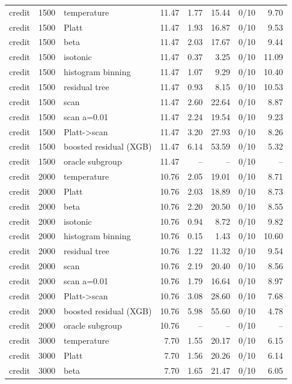 \begin{tabular}{lllrrrlr}
credit & 1500 & temperature & 11.47 & 1.77 & 15.44 & 0/10 & 9.70 \\
credit & 1500 & Platt & 11.47 & 1.93 & 16.87 & 0/10 & 9.53 \\
credit & 1500 & beta & 11.47 & 2.03 & 17.67 & 0/10 & 9.44 \\
credit & 1500 & isotonic & 11.47 & 0.37 & 3.25 & 0/10 & 11.09 \\
credit & 1500 & histogram binning & 11.47 & 1.07 & 9.29 & 0/10 & 10.40 \\
credit & 1500 & residual tree & 11.47 & 0.93 & 8.15 & 0/10 & 10.53 \\
credit & 1500 & scan & 11.47 & 2.60 & 22.64 & 0/10 & 8.87 \\
credit & 1500 & scan a=0.01 & 11.47 & 2.24 & 19.54 & 0/10 & 9.23 \\
credit & 1500 & Platt->scan & 11.47 & 3.20 & 27.93 & 0/10 & 8.26 \\
credit & 1500 & boosted residual (XGB) & 11.47 & 6.14 & 53.59 & 0/10 & 5.32 \\
credit & 1500 & oracle subgroup & 11.47 & -- & -- & 0/10 & -- \\
credit & 2000 & temperature & 10.76 & 2.05 & 19.01 & 0/10 & 8.71 \\
credit & 2000 & Platt & 10.76 & 2.03 & 18.89 & 0/10 & 8.73 \\
credit & 2000 & beta & 10.76 & 2.20 & 20.50 & 0/10 & 8.55 \\
credit & 2000 & isotonic & 10.76 & 0.94 & 8.72 & 0/10 & 9.82 \\
credit & 2000 & histogram binning & 10.76 & 0.15 & 1.43 & 0/10 & 10.60 \\
credit & 2000 & residual tree & 10.76 & 1.22 & 11.32 & 0/10 & 9.54 \\
credit & 2000 & scan & 10.76 & 2.19 & 20.40 & 0/10 & 8.56 \\
credit & 2000 & scan a=0.01 & 10.76 & 1.79 & 16.64 & 0/10 & 8.97 \\
credit & 2000 & Platt->scan & 10.76 & 3.08 & 28.60 & 0/10 & 7.68 \\
credit & 2000 & boosted residual (XGB) & 10.76 & 5.98 & 55.60 & 0/10 & 4.78 \\
credit & 2000 & oracle subgroup & 10.76 & -- & -- & 0/10 & -- \\
credit & 3000 & temperature & 7.70 & 1.55 & 20.17 & 0/10 & 6.15 \\
credit & 3000 & Platt & 7.70 & 1.56 & 20.26 & 0/10 & 6.14 \\
credit & 3000 & beta & 7.70 & 1.65 & 21.47 & 0/10 & 6.05 \\

\end{tabular}
